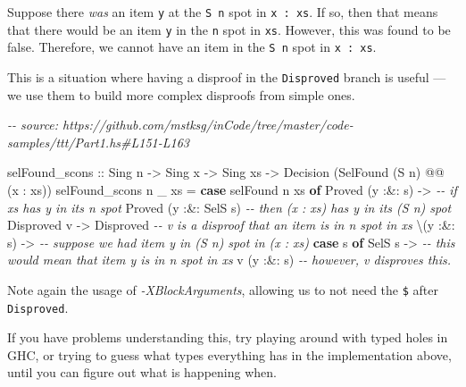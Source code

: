 \documentclass[]{article}
\newenvironment{Shaded}{}{}
\newcommand{\CommentTok}[1]{\textcolor[rgb]{0.38,0.63,0.69}{\textit{#1}}}
\newcommand{\DataTypeTok}[1]{\textcolor[rgb]{0.56,0.13,0.00}{#1}}
\newcommand{\KeywordTok}[1]{\textcolor[rgb]{0.00,0.44,0.13}{\textbf{#1}}}
\newcommand{\NormalTok}[1]{#1}
\newcommand{\OperatorTok}[1]{\textcolor[rgb]{0.40,0.40,0.40}{#1}}
\newcommand{\OtherTok}[1]{\textcolor[rgb]{0.00,0.44,0.13}{#1}}
\begin{document}
\begin{enumerate}
\begin{itemize}
    Suppose there \emph{was} an item \texttt{y} at the
    \texttt{\textquotesingle{}S\ n} spot in \texttt{x\ \textquotesingle{}:\ xs}.
    If so, then that means that there would be an item \texttt{y} in the
    \texttt{n} spot in \texttt{xs}. However, this was found to be false.
    Therefore, we cannot have an item in the \texttt{\textquotesingle{}S\ n}
    spot in \texttt{x\ \textquotesingle{}:\ xs}.

    This is a situation where having a disproof in the \texttt{Disproved} branch
    is useful --- we use them to build more complex disproofs from simple ones.
  \end{itemize}

\begin{Shaded}
\begin{Highlighting}[]
\CommentTok{{-}{-} source: https://github.com/mstksg/inCode/tree/master/code{-}samples/ttt/Part1.hs\#L151{-}L163}

\NormalTok{selFound\_scons}
\OtherTok{    ::} \DataTypeTok{Sing}\NormalTok{ n}
    \OtherTok{{-}\textgreater{}} \DataTypeTok{Sing}\NormalTok{ x}
    \OtherTok{{-}\textgreater{}} \DataTypeTok{Sing}\NormalTok{ xs}
    \OtherTok{{-}\textgreater{}} \DataTypeTok{Decision}\NormalTok{ (}\DataTypeTok{SelFound}\NormalTok{ (}\DataTypeTok{\textquotesingle{}S}\NormalTok{ n) }\OperatorTok{@@}\NormalTok{ (x \textquotesingle{}}\OperatorTok{:}\NormalTok{ xs))}
\NormalTok{selFound\_scons n \_ xs }\OtherTok{=} \KeywordTok{case}\NormalTok{ selFound n xs }\KeywordTok{of}
    \DataTypeTok{Proved}\NormalTok{ (y }\OperatorTok{:\&:}\NormalTok{ s) }\OtherTok{{-}\textgreater{}}       \CommentTok{{-}{-} if xs has y in its n spot}
      \DataTypeTok{Proved}\NormalTok{ (y }\OperatorTok{:\&:} \DataTypeTok{SelS}\NormalTok{ s)   }\CommentTok{{-}{-} then (x : xs) has y in its (S n) spot}
    \DataTypeTok{Disproved}\NormalTok{ v      }\OtherTok{{-}\textgreater{}} \DataTypeTok{Disproved} \CommentTok{{-}{-} v is a disproof that an item is in n spot in xs}
\NormalTok{      \textbackslash{}(y }\OperatorTok{:\&:}\NormalTok{ s) }\OtherTok{{-}\textgreater{}}      \CommentTok{{-}{-} suppose we had item y in (S n) spot in (x : xs)}
        \KeywordTok{case}\NormalTok{ s }\KeywordTok{of}
          \DataTypeTok{SelS}\NormalTok{ s\textquotesingle{} }\OtherTok{{-}\textgreater{}}     \CommentTok{{-}{-} this would mean that item \textquotesingle{}y\textquotesingle{} is in \textquotesingle{}n\textquotesingle{} spot in xs}
\NormalTok{            v (y }\OperatorTok{:\&:}\NormalTok{ s\textquotesingle{}) }\CommentTok{{-}{-} however, v disproves this.}
\end{Highlighting}
\end{Shaded}

  Note again the usage of \emph{-XBlockArguments}, allowing us to not need the
  \texttt{\$} after \texttt{Disproved}.

  If you have problems understanding this, try playing around with typed holes
  in GHC, or trying to guess what types everything has in the implementation
  above, until you can figure out what is happening when.
\end{enumerate}
\end{document}
